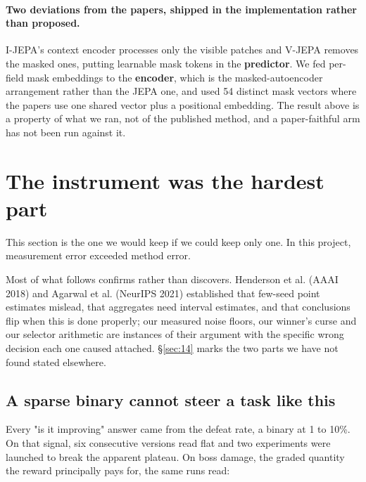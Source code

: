 \documentclass[11pt]{article}
\begin{document}
\paragraph{Two deviations from the papers, shipped in the implementation rather than proposed.} I-JEPA's context encoder processes only the visible patches and V-JEPA removes the masked ones, putting learnable mask tokens in the \textbf{predictor}. We fed per-field mask embeddings to the \textbf{encoder}, which is the masked-autoencoder arrangement rather than the JEPA one, and used 54 distinct mask vectors where the papers use one shared vector plus a positional embedding. The result above is a property of what we ran, not of the published method, and a paper-faithful arm has not been run against it.


\section{The instrument was the hardest part}
\label{sec:9}

This section is the one we would keep if we could keep only one. In this project, measurement error exceeded method error.

Most of what follows confirms rather than discovers. Henderson et al. (AAAI 2018) and Agarwal et al. (NeurIPS 2021) established that few-seed point estimates mislead, that aggregates need interval estimates, and that conclusions flip when this is done properly; our measured noise floors, our winner's curse and our selector arithmetic are instances of their argument with the specific wrong decision each one caused attached. \S\ref{sec:14} marks the two parts we have not found stated elsewhere.

\subsection{A sparse binary cannot steer a task like this}
\label{sec:9.1}

Every "is it improving" answer came from the defeat rate, a binary at 1 to 10\%. On that signal, six consecutive versions read flat and two experiments were launched to break the apparent plateau. On boss damage, the graded quantity the reward principally pays for, the same runs read:
\end{document}
